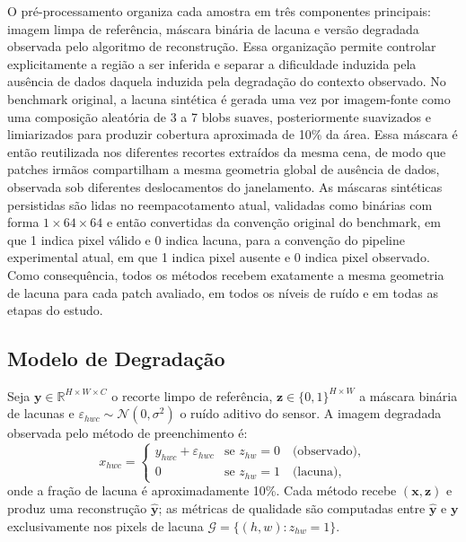 O pré-processamento organiza cada amostra em três componentes principais: imagem limpa de referência, máscara binária de lacuna e versão degradada observada pelo algoritmo de reconstrução.
Essa organização permite controlar explicitamente a região a ser inferida e separar a dificuldade induzida pela ausência de dados daquela induzida pela degradação do contexto observado.
No benchmark original, a lacuna sintética é gerada uma vez por imagem-fonte como uma composição aleatória de 3 a 7 blobs suaves, posteriormente suavizados e limiarizados para produzir cobertura aproximada de 10\% da área.
Essa máscara é então reutilizada nos diferentes recortes extraídos da mesma cena, de modo que patches irmãos compartilham a mesma geometria global de ausência de dados, observada sob diferentes deslocamentos do janelamento.
As máscaras sintéticas persistidas são lidas no reempacotamento atual, validadas como binárias com forma $1\times64\times64$ e então convertidas da convenção original do benchmark, em que 1 indica pixel válido e 0 indica lacuna, para a convenção do pipeline experimental atual, em que 1 indica pixel ausente e 0 indica pixel observado.
Como consequência, todos os métodos recebem exatamente a mesma geometria de lacuna para cada patch avaliado, em todos os níveis de ruído e em todas as etapas do estudo.



\subsection{Modelo de Degradação}

Seja $\mathbf{y} \in \mathbb{R}^{H \times W \times C}$ o recorte limpo de referência, $\mathbf{z} \in \{0,1\}^{H \times W}$ a máscara binária de lacunas e $\varepsilon_{hwc} \sim \mathcal{N}(0, \sigma^2)$ o ruído aditivo do sensor.
A imagem degradada observada pelo método de preenchimento é:
\[
  x_{hwc} =
  \begin{cases}
    y_{hwc} + \varepsilon_{hwc} & \text{se } z_{hw} = 0 \quad \text{(observado)},\\
    0 & \text{se } z_{hw} = 1 \quad \text{(lacuna)},
  \end{cases}
\]
onde a fração de lacuna é aproximadamente 10\%.
Cada método recebe $(\mathbf{x}, \mathbf{z})$ e produz uma reconstrução $\hat{\mathbf{y}}$;
as métricas de qualidade são computadas entre $\hat{\mathbf{y}}$ e $\mathbf{y}$ exclusivamente nos pixels de lacuna $\mathcal{G} = \{(h,w) : z_{hw} = 1\}$.

